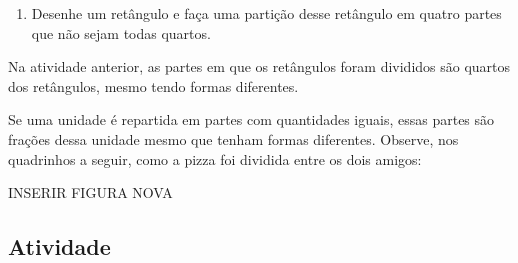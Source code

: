 \begin{enumerate} [\quad a)]
\begin{center}
\end{center}

  \item     Desenhe um retângulo e faça uma partição desse retângulo em quatro partes que não sejam todas quartos.
\end{enumerate}

\begin{refletindo*}[breakable]{}{}
  Na atividade anterior, as partes em que os retângulos foram divididos são quartos dos retângulos, mesmo tendo formas diferentes.

  \begin{center}
  \end{center}
  Se uma unidade é repartida em partes com quantidades iguais, essas partes são frações dessa unidade mesmo que tenham formas diferentes. Observe, nos quadrinhos a seguir, como a pizza foi dividida entre os dois amigos:

INSERIR FIGURA NOVA
  



\end{refletindo*}


\subsection{Atividade}


